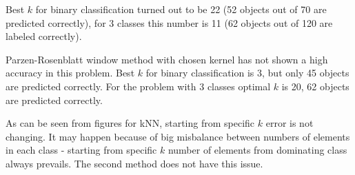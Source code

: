 \documentclass{article}
\begin{document}
Best $k$ for binary classification turned out to be 22 (52 objects out of 70 are predicted correctly), for 3 classes this number is 11 (62 objects out of 120 are labeled correctly).

Parzen-Rosenblatt window method with chosen kernel has not shown a high accuracy in this problem. Best $k$ for binary classification is 3, but only 45 objects are predicted correctly. For the problem with 3 classes optimal $k$ is 20, 62 objects are predicted correctly.

As can be seen from figures for kNN, starting from specific $k$ error is not changing. It may happen because of big misbalance between numbers of elements in each class - starting from specific $k$ number of elements from dominating class always prevails. The second method does not have this issue.
\end{document}
